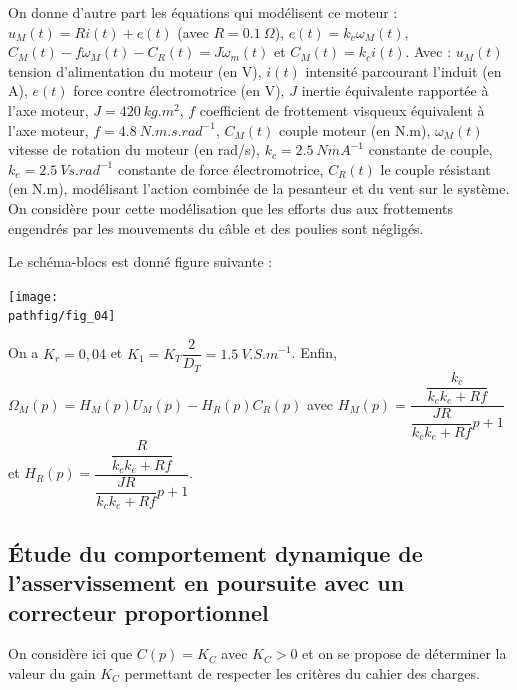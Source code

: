 \documentclass[10pt,fleqn]{article} %
\begin{document}


On donne d’autre part les équations qui modélisent ce moteur : $u_M(t)=R i(t) + e(t)$ (avec 
$R=\SI{0,1}{\Omega}$), 
$e(t) = k_e \omega_M(t)$, 
$C_M (t)-f\omega_M (t)-C_R (t)=J\dot{\omega}_m(t)$ et 
$C_M (t) = k_ c i(t)$. Avec : 
$u_M (t)$ tension d’alimentation du moteur (en V),  $i(t)$ intensité parcourant l’induit (en A), $e(t)$ force contre électromotrice (en V), $J$ inertie équivalente rapportée à l’axe moteur, $J = \SI{420}{kg.m^2}$, $f$ coefficient de frottement visqueux équivalent à l’axe moteur, $f = \SI{4,8}{N.m.s.rad^{-1}}$, $C_M (t)$ couple moteur (en N.m),  $\omega_M(t)$ vitesse de rotation du moteur (en rad/s), $k_c=\SI{2,5}{NmA^{-1}}$ constante de couple, $k_e=\SI{2,5}{Vs.rad^{-1}}$ constante de force électromotrice,  $C_R (t)$ le couple résistant (en N.m), modélisant l’action combinée de la pesanteur et du vent sur le système. On considère pour cette modélisation que les efforts dus aux frottements engendrés par les mouvements du câble et des poulies sont négligés.

Le schéma-blocs est donné figure suivante : 

\begin{center}
\texttt{[image: \\pathfig/fig\_04]}
\end{center}

On a $K_r = 0,04$ et $K_1=K_T\dfrac{2}{D_T}=\SI{1,5}{V.S.m^{-1}}$.
Enfin, $\Omega_M(p)=H_M(p)U_M(p)-H_R(p)C_R(p)$ avec $H_M(p)=\dfrac{\dfrac{k_c}{k_ck_e+Rf}}{\dfrac{JR}{k_ck_e+Rf}p+1}$ et $H_R(p)=\dfrac{\dfrac{R}{k_ck_e+Rf}}{\dfrac{JR}{k_ck_e+Rf}p+1}$.

\subsection*{Étude du comportement dynamique de l’asservissement en poursuite avec un correcteur proportionnel }
On considère ici que $C(p) = K_C$ avec $K_C > $0 et on se propose de déterminer la valeur du gain $K_C$ permettant de respecter les critères du cahier des charges. 
\end{document}
